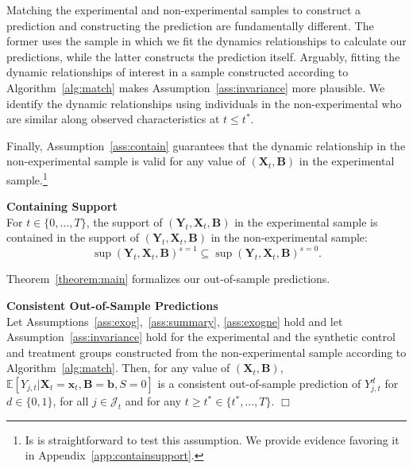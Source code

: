 Matching the experimental and non-experimental samples to construct a prediction and constructing the prediction are fundamentally different. The former uses the sample in which we fit the dynamics relationships to calculate our predictions, while the latter constructs the prediction itself. Arguably, fitting the dynamic relationships of interest in a sample constructed according to Algorithm~\ref{alg:match} makes Assumption~\ref{ass:invariance} more plausible. We identify the dynamic relationships using individuals in the non-experimental who are similar along observed characteristics at $t \leq t^*$.

Finally, Assumption~\ref{ass:contain} guarantees that the dynamic relationship in the non-experimental sample is valid for any value of $\left( \bm{X}_{t}, \bm{B} \right)$ in the experimental sample.\footnote{Is is straightforward to test this assumption. We provide evidence favoring it in Appendix~\ref{app:containsupport}.}

\onehalfspacing
\begin{assumption} \label{ass:contain} \textbf{Containing Support} \\
For $t \in \{ 0, \ldots, T \}$, the support of $\left( \bm{Y}_{t}, \bm{X}_{t}, \bm{B} \right)$ in the experimental sample is contained in the support of $\left( \bm{Y}_{t}, \bm{X}_{t}, \bm{B} \right)$ in the non-experimental sample:
\begin{equation}
\sup( \bm{Y}_{t}, \bm{X}_{t}, \bm{B} )^{s=1} \subseteq \sup( \bm{Y}_{t}, \bm{X}_{t}, \bm{B} )^{s=0}.
\end{equation}
\end{assumption}
\doublespacing

Theorem~\ref{theorem:main} formalizes our out-of-sample predictions.

\onehalfspacing
\begin{theorem}\label{theorem:main} \textbf{Consistent Out-of-Sample Predictions} \\
Let Assumptions~\ref{ass:exog},~\ref{ass:summary}, \ref{ass:exogne} hold and let Assumption~\ref{ass:invariance} hold for the experimental and the synthetic control and treatment groups constructed from the non-experimental sample according to Algorithm~\ref{alg:match}. Then, for any value of $\left( \bm{X}_{t}, \bm{B} \right)$, $\mathbb{E} \left[ Y_{j,t} | \bm{X}_{t} = \bm{x}_{t}, \bm{B} = \bm{b}, S = 0 \right]$ is a consistent out-of-sample prediction of $Y_{j,t}^d$ for $d \in \{ 0, 1\}$, for all $j \in \mathcal{J}_{t}$ and for any $t \geq t^* \in \{t^*, \ldots, T \}$. $\Box$
\end{theorem}

